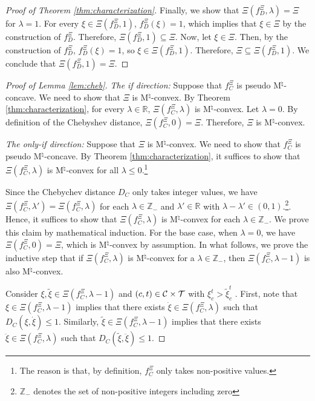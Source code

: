 \documentclass[12pt]{amsart}
\theoremstyle{remark}
\begin{document}
\begin{proof}[Proof of Theorem \ref{thm:characterization}]
Finally, we show that $\Xi(f^{\Xi}_D,\lambda) = \Xi  $ for $\lambda=1$. For every $\xi \in \Xi(f^{\Xi}_D,1)$,
$f^{\Xi}_D(\xi)=1$, which implies that $\xi \in \Xi $ by the construction of $f^{\Xi}_D$. Therefore,
$\Xi(f^{\Xi}_D,1)  \subseteq \Xi$. Now, let $\xi \in \Xi $. Then, by the construction of $f^{\Xi}_D$,
$f^{\Xi}_D(\xi)=1$, so $\xi \in \Xi(f^{\Xi}_D,1) $. Therefore, $\Xi \subseteq \Xi(f^{\Xi}_D,1)$.
We conclude that $\Xi(f^{\Xi}_D,1)=\Xi$.
\end{proof}
\medskip



\begin{proof}[Proof of Lemma \ref{lem:cheb}]
\emph{The if direction:} Suppose that $f_C^{\Xi}$ is pseudo M$^{\natural}$-concave. We need to show that $\Xi$ is M$^{\natural}$-convex. By Theorem \ref{thm:characterization},
for every $\lambda \in \mathbb{R}$, $\Xi(f_C^{\Xi},\lambda)$ is M$^{\natural}$-convex. Let $\lambda=0$. By definition of the Chebyshev distance,
$\Xi(f_C^{\Xi},0)=\Xi$. Therefore, $\Xi$ is M$^{\natural}$-convex.
\medskip

\noindent
\emph{The only-if direction:} Suppose that $\Xi$ is M$^{\natural}$-convex. We need to show that $f_C^{\Xi}$ is pseudo M$^{\natural}$-concave.
By Theorem \ref{thm:characterization}, it suffices to show that $\Xi(f_C^{\Xi},\lambda)$ is M$^{\natural}$-convex for all $\lambda \leq 0$.\footnote{The reason is that, by definition, $f_C^{\Xi}$ only takes non-positive values.}

Since the Chebychev distance $D_C$ only takes integer values, we have $\Xi(f_C^{\Xi},\lambda') = \Xi(f_C^{\Xi},\lambda)$ for each $\lambda \in \mathbb{Z}_-$ and
$\lambda' \in  \mathbb{R}$ with $\lambda - \lambda' \in (0,1)$.\footnote{$\mathbb{Z_-}$ denotes the set of non-positive integers including zero}.
Hence, it suffices to show that
$\Xi(f_C^{\Xi},\lambda)$ is M$^{\natural}$-convex for each $\lambda \in \mathbb{Z_-}$. We prove this claim by mathematical induction. For the base case, when $\lambda=0$, we have $\Xi(f_C^{\Xi},0) = \Xi$, which is M$^{\natural}$-convex by assumption. In what follows, we prove the inductive step
that if $\Xi(f_C^{\Xi},\lambda)$ is M$^{\natural}$-convex for a $\lambda \in \mathbb{Z}_-$, then $\Xi(f_C^{\Xi},\lambda-1)$ is also M$^{\natural}$-convex.

Consider $\xi, \tilde{\xi} \in \Xi(f_C^{\Xi},\lambda-1)$ and $(c,t) \in \mathcal{C} \times \mathcal{T}$ with $\xi_c^t>\tilde{\xi}_c^t$ . First, note that $\xi \in \Xi(f_C^{\Xi},\lambda-1)$ implies that there exists $\dot{\xi} \in \Xi(f_C^{\Xi},\lambda)$ such that $D_C(\xi,\dot{\xi}) \leq 1$. Similarly, $\tilde{\xi} \in \Xi(f_C^{\Xi},\lambda-1)$ implies that there exists $\ddot{\xi} \in \Xi(f_C^{\Xi},\lambda)$ such that $D_C(\tilde{\xi},\ddot{\xi}) \leq 1$.


\end{proof}
\end{document}
